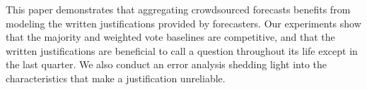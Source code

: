 This paper demonstrates that aggregating crowdsourced forecasts benefits from modeling the written justifications provided by forecasters. Our experiments show that the majority and weighted vote baselines are competitive, and that the written justifications are beneficial to call a question throughout its life except in the last quarter. We also conduct an error analysis shedding light into the characteristics that make a justification unreliable.
